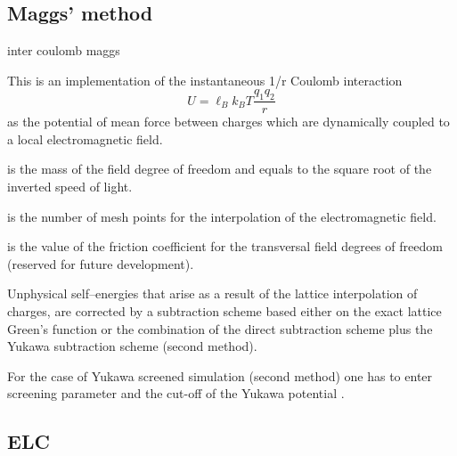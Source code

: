 \subsection{Maggs' method}

\begin{essyntax}
  inter coulomb
  maggs   
\end{essyntax}

This is an implementation of the instantaneous 1/r Coulomb interaction
\begin{equation}
  U = \ell_B k_B T \frac{q_1 q_2}{r}
\end{equation}
as the potential of mean force between charges which are dynamically
coupled to a local electromagnetic field.

\begin{arguments}
\item[\var{f\_mass}] is the mass of the field degree of freedom and equals
  to the square root of the inverted speed of light.
\item[\var{mesh}] is the number of mesh points for the interpolation
  of the electromagnetic field.
\item[\var{field\_friction}] is the value of the friction coefficient
  for the transversal field degrees of freedom (reserved for future
  development).
\end{arguments}
Unphysical self--energies that arise as a result of the lattice
interpolation of charges, are corrected by a subtraction scheme based
either on the exact lattice Green's function or the combination of the
direct subtraction scheme plus the Yukawa subtraction scheme (second
method).

For the case of Yukawa screened simulation (second method) one has to
enter screening parameter  and the cut-off of the Yukawa
potential .

\subsection{ELC}

